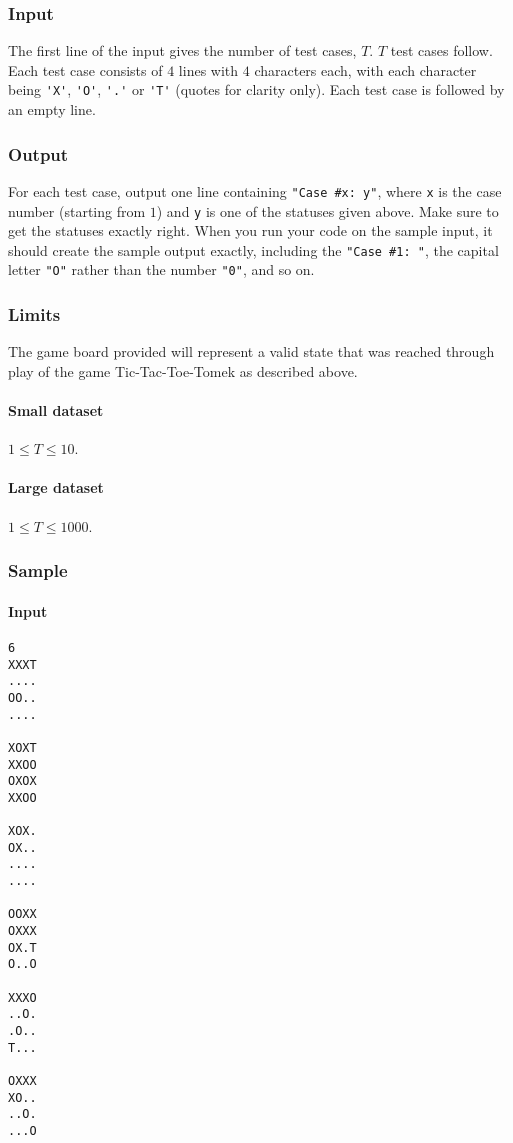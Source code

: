 \documentclass[titlepage]{article}
\begin{document}
\subsubsection{Input}
The first line of the input gives the number of test cases, $T$. $T$ test cases follow. Each test case consists of $4$ lines with $4$ characters each, with each character being \verb+'X'+, \verb+'O'+, \verb+'.'+ or \verb+'T'+ (quotes for clarity only). Each test case is followed by an empty line.

\subsubsection{Output}
For each test case, output one line containing \verb+"Case #x: y"+, where \verb+x+ is the case number (starting from $1$) and \verb+y+ is one of the statuses given above. Make sure to get the statuses exactly right. When you run your code on the sample input, it should create the sample output exactly, including the \verb+"Case #1: "+, the capital letter \verb+"O"+ rather than the number \verb+"0"+, and so on.

\subsubsection{Limits}
The game board provided will represent a valid state that was reached through play of the game Tic-Tac-Toe-Tomek as described above.
\paragraph{Small dataset} $1\leq T\leq 10$.
\paragraph{Large dataset} $1\leq T\leq 1000$.

\subsubsection{Sample}
\paragraph{Input}
\begin{verbatim} 
6
XXXT
....
OO..
....

XOXT
XXOO
OXOX
XXOO

XOX.
OX..
....
....

OOXX
OXXX
OX.T
O..O

XXXO
..O.
.O..
T...

OXXX
XO..
..O.
...O
\end{verbatim}
\end{document}
